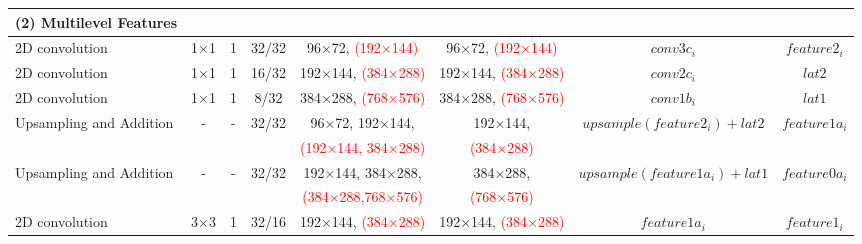 \begin{table}[htbp]
\begin{adjustbox}{width=1\textwidth}
\begin{tabular}{|l|c|c|c|c|c|c|c|}
\hline
\rowcolor{bgcolor}
\textbf{(2) Multilevel Features} &                 &                 &                 &                 &                 &                    &                 \\ \hline
\hspace{0.75cm}2D convolution                            & 1×1             & 1               & 32/32        & 96×72, \textcolor{red}{(192×144)}          & 96×72, \textcolor{red}{(192×144)}           & $conv3c_i$            & $feature2_{i}$         \\ \hline
\hspace{0.75cm}2D convolution                            & 1×1             & 1               & 16/32        & 192×144, \textcolor{red}{(384×288)}        & 192×144, \textcolor{red}{(384×288)}           & $conv2c_i$                    & $lat2$         \\ \hline
\hspace{0.75cm}2D convolution                            & 1×1             & 1               & 8/32        & 384×288, \textcolor{red}{(768×576)}          & 384×288, \textcolor{red}{(768×576)}         & $conv1b_i$            & $lat1$         \\ \hline
\hspace{0.75cm}Upsampling and Addition                           & -             & -               & 32/32        & 96×72, 192×144,            & 192×144,           & $upsample(feature2_{i}) + lat2$            & $feature1a_{i}$         \\ 
                                                                &                 &                 &                 & \textcolor{red}{(192×144, 384×288)}                &  \textcolor{red}{(384×288)}               &                    &                 \\ \hline
\hspace{0.75cm}Upsampling and Addition                           & -             & -               & 32/32        & 192×144,  384×288,          & 384×288,          & $upsample(feature1a_{i}) + lat1$            & $feature0a_{i}$         \\ 
                                                                &                 &                 &                 & \textcolor{red}{(384×288,768×576)}                &  \textcolor{red}{(768×576)}               &                    &                 \\ \hline
\hspace{0.75cm}2D convolution                            & 3×3             & 1               & 32/16        & 192×144, \textcolor{red}{(384×288)}           & 192×144, \textcolor{red}{(384×288)}            & $feature1a_{i}$            & $feature1_{i}$         \\ \hline

\end{tabular}
\end{adjustbox}
\end{table}
